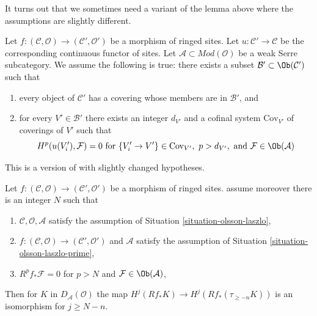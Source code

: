 \noindent
It turns out that we sometimes need a variant of the lemma above
where the assumptions are slightly different.

\begin{situation}
\label{situation-olsson-laszlo-prime}
Let
$f : (\mathcal{C}, \mathcal{O}) \to (\mathcal{C}', \mathcal{O}')$
be a morphism of ringed sites. Let $u : \mathcal{C}' \to \mathcal{C}$
be the corresponding continuous functor of sites.
Let $\mathcal{A} \subset \textit{Mod}(\mathcal{O})$
be a weak Serre subcategory. We assume the following is true:
there exists a subset $\mathcal{B}' \subset \Ob(\mathcal{C}')$ such that
\begin{enumerate}
\item every object of $\mathcal{C}'$ has a covering whose
members are in $\mathcal{B}'$, and
\item for every $V' \in \mathcal{B}'$ there exists an integer $d_{V'}$
and a cofinal system $\text{Cov}_{V'}$ of coverings of $V'$ such
that
$$
H^p(u(V'_i), \mathcal{F}) = 0 \text{ for }
\{V'_i \to V'\} \in \text{Cov}_{V'},\ p > d_{V'}, \text{ and }
\mathcal{F} \in \Ob(\mathcal{A})
$$
\end{enumerate}
\end{situation}

\begin{lemma}
\label{lemma-olsson-laszlo-map-version-two}
\begin{reference}
This is a version of \cite[Lemma 2.1.10]{six-I} with slightly changed
hypotheses.
\end{reference}
Let $f : (\mathcal{C}, \mathcal{O}) \to (\mathcal{C}', \mathcal{O}')$
be a morphism of ringed sites.
assume moreover there is an integer $N$ such that
\begin{enumerate}
\item $\mathcal{C}, \mathcal{O}, \mathcal{A}$ satisfy the
assumption of Situation \ref{situation-olsson-laszlo},
\item $f : (\mathcal{C}, \mathcal{O}) \to (\mathcal{C}', \mathcal{O}')$
and $\mathcal{A}$ satisfy the assumption of
Situation \ref{situation-olsson-laszlo-prime},
\item $R^pf_*\mathcal{F} = 0$ for
$p > N$ and $\mathcal{F} \in \Ob(\mathcal{A})$,
\end{enumerate}
Then for $K$ in $D_\mathcal{A}(\mathcal{O})$ the map
$H^j(Rf_*K) \to H^j(Rf_*(\tau_{\geq -n}K))$ is an isomorphism
for $j \geq N - n$.
\end{lemma}

